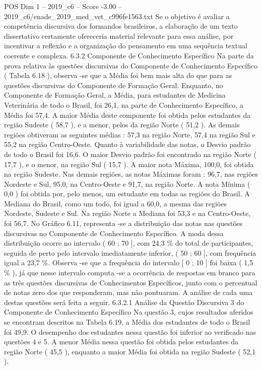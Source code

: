 \begin{textsample}{POS Dim 1 – 2019\_c6 – Score -3.00 – 2019\_c6/enade\_2019\_med\_vet\_c996fe1563.txt}
Se o objetivo é avaliar a competência discursiva dos formandos brasileiros, a elaboração de um texto dissertativo certamente ofereceria material relevante para essa análise, por incentivar a reflexão e a organização do pensamento em uma sequência textual coerente e complexa. 6.3.2 Componente de Conhecimento Específico Na parte da prova relativa às questões discursivas do Componente de Conhecimento Específico ( Tabela 6.18 ), observa -se que a Média foi bem mais alta do que para as questões discursivas do Componente de Formação Geral.
Enquanto, no Componente de Formação Geral, a Média, para estudantes de Medicina Veterinária de todo o Brasil, foi 26,1, na parte de Conhecimento Específico, a Média foi 57,4.
A maior Média deste componente foi obtida pelos estudantes da região Sudeste ( 58,7 ), e a menor, pelos da região Norte ( 51,2 ).
As demais regiões obtiveram as seguintes médias : 57,3 na região Norte, 57,4 na região Sul e 55,2 na região Centro-Oeste.
Quanto à variabilidade das notas, o Desvio padrão de todo o Brasil foi 16,6.
O maior Desvio padrão foi encontrado na região Norte ( 17,7 ), e o menor, na região Sul ( 15,7 ).
A maior nota Máxima, 100,0, foi obtida na região Sudeste.
Nas demais regiões, as notas Máximas foram : 96,7, nas regiões Nordeste e Sul, 95,0, na Centro-Oeste e 91,7, na região Norte.
A nota Mínima ( 0,0 ) foi obtida por, pelo menos, um estudante em todas as regiões do Brasil.
A Mediana do Brasil, como um todo, foi igual a 60,0, a mesma das regiões Nordeste, Sudeste e Sul.
Na região Norte a Mediana foi 53,3 e na Centro-Oeste, foi 56,7.
No Gráfico 6.11, representa -se a distribuição das notas nas questões discursivas no Componente de Conhecimento Específico.
A moda dessa distribuição ocorre no intervalo ( 60 ; 70 ], com 24,3 \% do total de participantes, seguida de perto pelo intervalo imediatamente inferior, ( 50 ; 60 ], com frequência igual a 23,7 \%.
Observa -se que a frequência do intervalo [ 0 ; 10 ] foi baixa ( 1,5 \% ), já que nesse intervalo computa -se a ocorrência de respostas em branco para as três questões discursivas de Conhecimentos Específicos, junto com o percentual de notas zero dos que responderam, mas não pontuaram.
A análise de cada uma destas questões será feita a seguir. 6.3.2.1 Análise da Questão Discursiva 3 do Componente de Conhecimento Específico Na questão 3, cujos resultados aferidos se encontram descritos na Tabela 6.19, a Média dos estudantes de todo o Brasil foi 49,9.
O desempenho dos estudantes nessa questão foi inferior ao verificado nas questões 4 e 5.
A menor Média nessa questão foi obtida pelos estudantes da região Norte ( 45,5 ), enquanto a maior Média foi obtida na região Sudeste ( 52,1 ).

\end{textsample}
